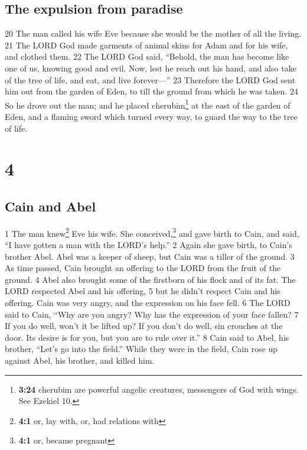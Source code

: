 \hypertarget{the-expulsion-from-paradise}{%
\subsection{The expulsion from
paradise}\label{the-expulsion-from-paradise}}

{20} The man called his wife Eve because she would be the mother of all
the living. {21} The LORD God made garments of animal skins for Adam and
for his wife, and clothed them. {22} The LORD God said, ``Behold, the
man has become like one of us, knowing good and evil. Now, lest he reach
out his hand, and also take of the tree of life, and eat, and live
forever---'' {23} Therefore the LORD God sent him out from the garden of
Eden, to till the ground from which he was taken. {24} So he drove out
the man; and he placed cherubim\footnote{\textbf{3:24} cherubim are
  powerful angelic creatures, messengers of God with wings. See Ezekiel
  10.} at the east of the garden of Eden, and a flaming sword which
turned every way, to guard the way to the tree of life.

\hypertarget{section-3}{%
\section{4}\label{section-3}}

\hypertarget{cain-and-abel}{%
\subsection{Cain and Abel}\label{cain-and-abel}}

{1} The man knew\footnote{\textbf{4:1} or, lay with, or, had relations
  with} Eve his wife. She conceived,\footnote{\textbf{4:1} or, became
  pregnant} and gave birth to Cain, and said, ``I have gotten a man with
the LORD's help.'' {2} Again she gave birth, to Cain's brother Abel.
Abel was a keeper of sheep, but Cain was a tiller of the ground. {3} As
time passed, Cain brought an offering to the LORD from the fruit of the
ground. {4} Abel also brought some of the firstborn of his flock and of
its fat. The LORD respected Abel and his offering, {5} but he didn't
respect Cain and his offering. Cain was very angry, and the expression
on his face fell. {6} The LORD said to Cain, ``Why are you angry? Why
has the expression of your face fallen? {7} If you do well, won't it be
lifted up? If you don't do well, sin crouches at the door. Its desire is
for you, but you are to rule over it.'' {8} Cain said to Abel, his
brother, ``Let's go into the field.'' While they were in the field, Cain
rose up against Abel, his brother, and killed him.

